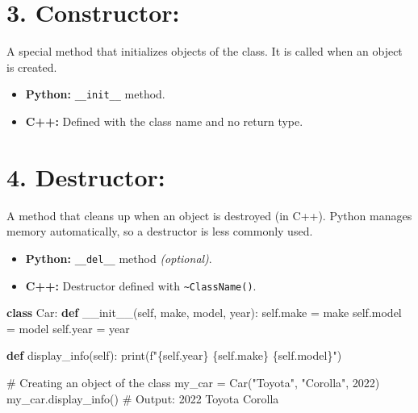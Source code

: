 \documentclass[
  letterpaper,
  DIV=11,
  numbers=noendperiod]{scrreprt}
\newenvironment{Shaded}{\begin{snugshade}}{\end{snugshade}}
\newcommand{\BuiltInTok}[1]{\textcolor[rgb]{0.00,0.23,0.31}{#1}}
\newcommand{\CommentTok}[1]{\textcolor[rgb]{0.37,0.37,0.37}{#1}}
\newcommand{\DecValTok}[1]{\textcolor[rgb]{0.68,0.00,0.00}{#1}}
\newcommand{\FunctionTok}[1]{\textcolor[rgb]{0.28,0.35,0.67}{#1}}
\newcommand{\KeywordTok}[1]{\textcolor[rgb]{0.00,0.23,0.31}{\textbf{#1}}}
\newcommand{\NormalTok}[1]{\textcolor[rgb]{0.00,0.23,0.31}{#1}}
\newcommand{\OperatorTok}[1]{\textcolor[rgb]{0.37,0.37,0.37}{#1}}
\newcommand{\SpecialCharTok}[1]{\textcolor[rgb]{0.37,0.37,0.37}{#1}}
\newcommand{\SpecialStringTok}[1]{\textcolor[rgb]{0.13,0.47,0.30}{#1}}
\newcommand{\StringTok}[1]{\textcolor[rgb]{0.13,0.47,0.30}{#1}}
\newcommand{\VariableTok}[1]{\textcolor[rgb]{0.07,0.07,0.07}{#1}}
\providecommand{\tightlist}{%
  \setlength{\itemsep}{0pt}\setlength{\parskip}{0pt}}
\begin{document}
\section{3. Constructor:}

A special method that initializes objects of the class. It is called
when an object is created.

\begin{itemize}
\tightlist
\item
  \textbf{Python:} \texttt{\_\_init\_\_} method.
\item
  \textbf{C++:} Defined with the class name and no return type.
\end{itemize}

\section{4. Destructor:}

A method that cleans up when an object is destroyed (in C++). Python
manages memory automatically, so a destructor is less commonly used.

\begin{itemize}
\tightlist
\item
  \textbf{Python:} \texttt{\_\_del\_\_} method \emph{(optional)}.
\item
  \textbf{C++:} Destructor defined with
  \texttt{\textasciitilde{}ClassName()}.
\end{itemize}

\begin{Shaded}
\begin{Highlighting}[]
\KeywordTok{class}\NormalTok{ Car:}
    \KeywordTok{def} \FunctionTok{\_\_init\_\_}\NormalTok{(}\VariableTok{self}\NormalTok{, make, model, year):}
        \VariableTok{self}\NormalTok{.make }\OperatorTok{=}\NormalTok{ make}
        \VariableTok{self}\NormalTok{.model }\OperatorTok{=}\NormalTok{ model}
        \VariableTok{self}\NormalTok{.year }\OperatorTok{=}\NormalTok{ year}

    \KeywordTok{def}\NormalTok{ display\_info(}\VariableTok{self}\NormalTok{):}
        \BuiltInTok{print}\NormalTok{(}\SpecialStringTok{f"}\SpecialCharTok{\{}\VariableTok{self}\SpecialCharTok{.}\NormalTok{year}\SpecialCharTok{\}}\SpecialStringTok{ }\SpecialCharTok{\{}\VariableTok{self}\SpecialCharTok{.}\NormalTok{make}\SpecialCharTok{\}}\SpecialStringTok{ }\SpecialCharTok{\{}\VariableTok{self}\SpecialCharTok{.}\NormalTok{model}\SpecialCharTok{\}}\SpecialStringTok{"}\NormalTok{)}

\CommentTok{\# Creating an object of the class}
\NormalTok{my\_car }\OperatorTok{=}\NormalTok{ Car(}\StringTok{"Toyota"}\NormalTok{, }\StringTok{"Corolla"}\NormalTok{, }\DecValTok{2022}\NormalTok{)}
\NormalTok{my\_car.display\_info()  }\CommentTok{\# Output: 2022 Toyota Corolla}
\end{Highlighting}
\end{Shaded}
\end{document}
